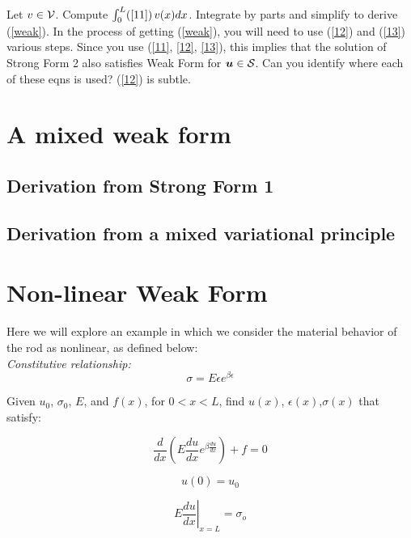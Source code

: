 \documentclass[12pt,american]{article}
\def\beq{\begin{equation}}
\def\eeq{\end{equation}}
\def \u{\mbox{\boldmath{$u$}}}
\def \sigo{\sigma_{o}}
\def \cS{{\cal{S}}}
\def \cV{{\cal{V}}}
\begin{document}
\begin{tcolorbox}[title= Exercise: Derive the weak form from the strong form] 
Let $v \in \cV$.  Compute $\int_0^L (\ref{11})\,  v(x) dx$.  
Integrate by parts and simplify to derive (\ref{weak}).  
In the process of getting (\ref{weak}), you will need to use (\ref{12}) and (\ref{13}) 
various steps.  Since you use (\ref{11}, \ref{12}, \ref{13}), this implies that the 
solution of Strong Form 2 also satisfies Weak Form for $\u \in \cS$.  
Can you identify where each of these eqns is used? 
(\ref{12}) is subtle.
\end{tcolorbox}




\section{A mixed weak form}

\subsection{Derivation from Strong Form 1}

\subsection{Derivation from a mixed variational principle}





\section{Non-linear Weak Form}

Here we will explore an example in which we consider the material behavior of the rod as nonlinear, as defined below:
\\
{\em Constitutive relationship:}
\beq
\sigma = E \epsilon e^{\beta \epsilon}
\eeq

\begin{tcolorbox}[title= Nonlinear Strong Form]
Given $u_0$, $ \sigma_0 $, $E$, and $f(x)$, for $0<x<L$, find $u(x)$, $\epsilon(x)$,$\sigma(x)$ that satisfy:

\beq
\frac{d}{dx} \left( E \frac{du}{dx} e^{\beta \frac{du}{dx}} \right) + f = 0
\eeq

\beq
u(0) = u_0
\eeq

\beq
\left. E\frac{du}{dx} \right|_{x=L} = \sigo
\eeq

\end{tcolorbox}
\end{document}
